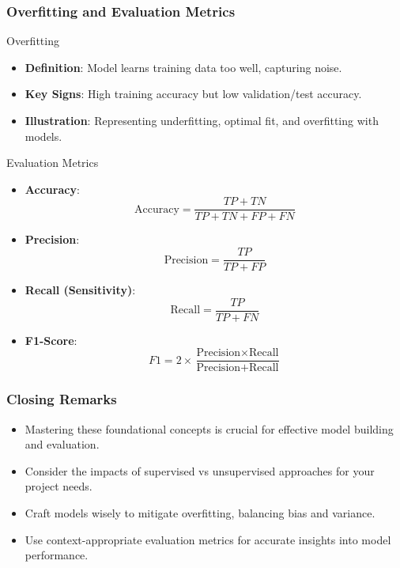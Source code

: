 \documentclass[aspectratio=169]{beamer}
\begin{document}
\begin{frame}[fragile]
    \frametitle{Overfitting and Evaluation Metrics}
    \begin{block}{Overfitting}
        \begin{itemize}
            \item \textbf{Definition}: Model learns training data too well, capturing noise.
            \item \textbf{Key Signs}: High training accuracy but low validation/test accuracy.
            \item \textbf{Illustration}: Representing underfitting, optimal fit, and overfitting with models.
        \end{itemize}
    \end{block}
    
    \begin{block}{Evaluation Metrics}
        \begin{itemize}
            \item \textbf{Accuracy}: 
              \begin{equation}
              \text{Accuracy} = \frac{TP + TN}{TP + TN + FP + FN}
              \end{equation}
            \item \textbf{Precision}: 
              \begin{equation}
              \text{Precision} = \frac{TP}{TP + FP}
              \end{equation}
            \item \textbf{Recall (Sensitivity)}: 
              \begin{equation}
              \text{Recall} = \frac{TP}{TP + FN}
              \end{equation}
            \item \textbf{F1-Score}: 
              \begin{equation}
              F1 = 2 \times \frac{\text{Precision} \times \text{Recall}}{\text{Precision} + \text{Recall}}
              \end{equation}
        \end{itemize}
    \end{block}
\end{frame}

\begin{frame}[fragile]
    \frametitle{Closing Remarks}
    \begin{itemize}
        \item Mastering these foundational concepts is crucial for effective model building and evaluation.
        \item Consider the impacts of supervised vs unsupervised approaches for your project needs.
        \item Craft models wisely to mitigate overfitting, balancing bias and variance.
        \item Use context-appropriate evaluation metrics for accurate insights into model performance.
    \end{itemize}
\end{frame}
\end{document}
